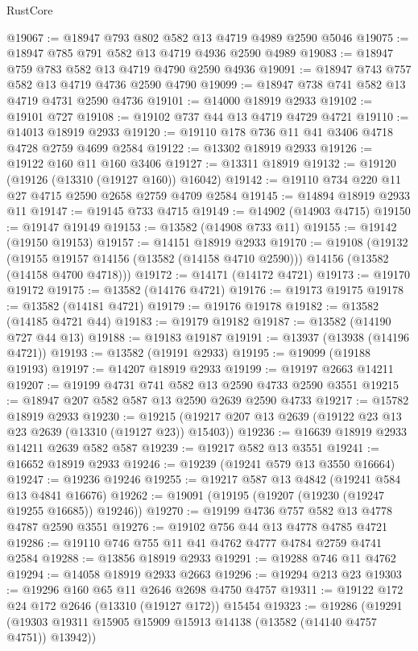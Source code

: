 \begin{lexlean}{RustCore}
\begin{coremodule}
@19067 := @18947 @793 @802 @582 @13 @4719 @4989 @2590 @5046
@19075 := @18947 @785 @791 @582 @13 @4719 @4936 @2590 @4989
@19083 := @18947 @759 @783 @582 @13 @4719 @4790 @2590 @4936
@19091 := @18947 @743 @757 @582 @13 @4719 @4736 @2590 @4790
@19099 := @18947 @738 @741 @582 @13 @4719 @4731 @2590 @4736
@19101 := @14000 @18919 @2933
@19102 := @19101 @727
@19108 := @19102 @737 @44 @13 @4719 @4729 @4721
@19110 := @14013 @18919 @2933
@19120 := @19110 @178 @736 @11 @41 @3406 @4718 @4728 @2759 @4699 @2584
@19122 := @13302 @18919 @2933
@19126 := @19122 @160 @11 @160 @3406
@19127 := @13311 @18919
@19132 := @19120 (@19126 (@13310 (@19127 @160)) @16042)
@19142 := @19110 @734 @220 @11 @27 @4715 @2590 @2658 @2759 @4709 @2584
@19145 := @14894 @18919 @2933 @11
@19147 := @19145 @733 @4715
@19149 := @14902 (@14903 @4715)
@19150 := @19147 @19149
@19153 := @13582 (@14908 @733 @11)
@19155 := @19142 (@19150 @19153)
@19157 := @14151 @18919 @2933
@19170 := @19108
    (@19132
      (@19155 @19157 @14156 (@13582 (@14158 @4710 @2590)))
      @14156
      (@13582 (@14158 @4700 @4718)))
@19172 := @14171 (@14172 @4721)
@19173 := @19170 @19172
@19175 := @13582 (@14176 @4721)
@19176 := @19173 @19175
@19178 := @13582 (@14181 @4721)
@19179 := @19176 @19178
@19182 := @13582 (@14185 @4721 @44)
@19183 := @19179 @19182
@19187 := @13582 (@14190 @727 @44 @13)
@19188 := @19183 @19187
@19191 := @13937 (@13938 (@14196 @4721))
@19193 := @13582 (@19191 @2933)
@19195 := @19099 (@19188 @19193)
@19197 := @14207 @18919 @2933
@19199 := @19197 @2663 @14211
@19207 := @19199 @4731 @741 @582 @13 @2590 @4733 @2590 @3551
@19215 := @18947 @207 @582 @587 @13 @2590 @2639 @2590 @4733
@19217 := @15782 @18919 @2933
@19230 := @19215 (@19217 @207 @13 @2639 (@19122 @23 @13 @23 @2639 (@13310 (@19127 @23)) @15403))
@19236 := @16639 @18919 @2933 @14211 @2639 @582 @587
@19239 := @19217 @582 @13 @3551
@19241 := @16652 @18919 @2933
@19246 := @19239 (@19241 @579 @13 @3550 @16664)
@19247 := @19236 @19246
@19255 := @19217 @587 @13 @4842 (@19241 @584 @13 @4841 @16676)
@19262 := @19091 (@19195 (@19207 (@19230 (@19247 @19255 @16685)) @19246))
@19270 := @19199 @4736 @757 @582 @13 @4778 @4787 @2590 @3551
@19276 := @19102 @756 @44 @13 @4778 @4785 @4721
@19286 := @19110 @746 @755 @11 @41 @4762 @4777 @4784 @2759 @4741 @2584
@19288 := @13856 @18919 @2933
@19291 := @19288 @746 @11 @4762
@19294 := @14058 @18919 @2933 @2663
@19296 := @19294 @213 @23
@19303 := @19296 @160 @65 @11 @2646 @2698 @4750 @4757
@19311 := @19122 @172 @24 @172 @2646 (@13310 (@19127 @172)) @15454
@19323 := @19286
    (@19291 (@19303 @19311 @15905 @15909 @15913 @14138 (@13582 (@14140 @4757 @4751)) @13942))

\end{coremodule}
\end{lexlean}
